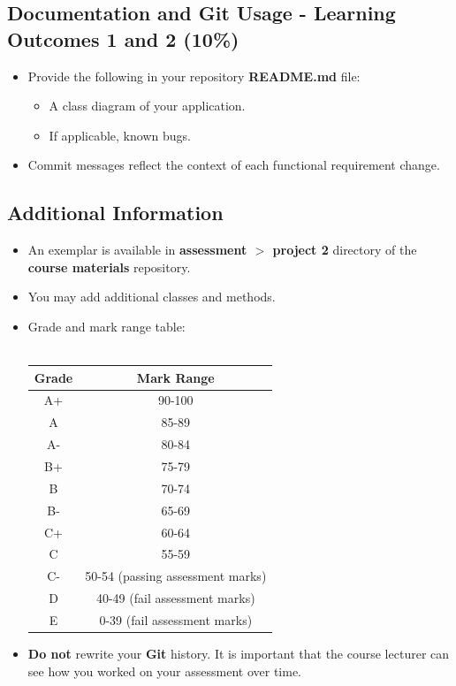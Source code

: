 \documentclass{article}
\begin{document}
\subsection*{Documentation and Git Usage - Learning Outcomes 1 and 2 (10\%)}
\begin{itemize}
    \item Provide the following in your repository \textbf{README.md} file:
    \begin{itemize}
        \item A class diagram of your application.
        \item If applicable, known bugs.
    \end{itemize}
    \item Commit messages reflect the context of each functional requirement change.
\end{itemize}

\subsection*{Additional Information}
\begin{itemize}
    \item An exemplar is available in \textbf{assessment $>$ project 2} directory of the \textbf{course materials} repository.
    \item You may add additional classes and methods. 
    \item Grade and mark range table:\\\\
    \renewcommand{\arraystretch}{1.5}
    \begin{tabular}{|c|c|}
        \hline
        \textbf{Grade} & \textbf{Mark Range} \\ \hline
        A+ & 90-100  \\ \hline
        A & 85-89  \\ \hline
        A- & 80-84 \\ \hline
        B+ & 75-79   \\ \hline
        B & 70-74  \\ \hline
        B- & 65-69  \\ \hline
        C+ & 60-64  \\ \hline
        C & 55-59 \\ \hline
        C- & 50-54 (passing assessment marks)  \\ \hline
        D & 40-49 (fail assessment marks)   \\ \hline
        E & 0-39 (fail assessment marks)   \\ \hline
    \end{tabular}
    \item \textbf{Do not} rewrite your \textbf{Git} history. It is important that the course lecturer can see how you worked on your assessment over time.
\end{itemize}
\end{document}
